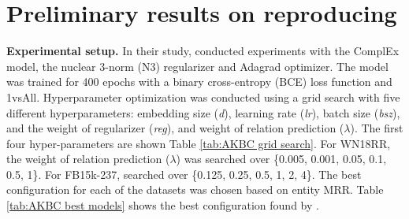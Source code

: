 
\section{Preliminary results on reproducing}

\noindent\textbf{Experimental setup.} In their study, \citet{chen2021relation} conducted experiments with the ComplEx model, the nuclear 3-norm (N3) regularizer and Adagrad optimizer. The model was trained for 400 epochs with a binary cross-entropy (BCE) loss function and 1vsAll. Hyperparameter optimization was conducted using a grid search with five different hyperparameters: embedding size (\textit{d}), learning rate (\textit{lr}), batch size (\textit{bsz}), and the weight of regularizer (\textit{reg}), and weight of relation prediction ($\lambda$). The first four hyper-parameters are shown Table \ref{tab:AKBC grid search}. For WN18RR, the weight of relation prediction ($\lambda$) was searched over \{0.005, 0.001, 0.05, 0.1, 0.5, 1\}. For FB15k-237, \citet{chen2021relation} searched over \{0.125, 0.25, 0.5, 1, 2, 4\}. The best configuration for each of the datasets was chosen based on entity MRR. Table \ref{tab:AKBC best models} shows the best configuration found by \citet{chen2021relation}.

\begin{table}[!htbp]
\centering
{}
\caption[Hyperparameter values from Chen et. al. paper]{Hyperparameter values used by \citet{chen2021relation} to find best models}
\label{tab:AKBC grid search}
\end{table}


